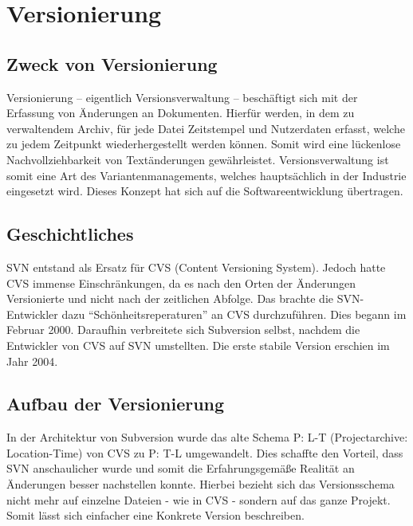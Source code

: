 \section{Versionierung}%

\subsection{Zweck von Versionierung}

Versionierung -- eigentlich Versionsverwaltung -- beschäftigt sich mit der Erfassung von Änderungen an Dokumenten. Hierfür werden, in dem zu verwaltendem Archiv, für jede Datei Zeitstempel und Nutzerdaten erfasst, welche zu jedem Zeitpunkt wiederhergestellt werden können. Somit wird eine lückenlose Nachvollziehbarkeit von Textänderungen gewährleistet. Versionsverwaltung ist somit eine Art des Variantenmanagements, welches hauptsächlich in der Industrie eingesetzt wird. Dieses Konzept hat sich auf die Softwareentwicklung übertragen. 

\subsection{Geschichtliches}
SVN entstand als Ersatz für CVS (Content Versioning System). Jedoch hatte CVS immense Einschränkungen, da es nach den Orten der Änderungen Versionierte und nicht nach der zeitlichen Abfolge. Das brachte die SVN-Entwickler dazu "`Schönheitsreperaturen"' an CVS durchzuführen. Dies begann im Februar 2000. Daraufhin verbreitete sich Subversion selbst, nachdem die Entwickler von CVS auf SVN umstellten. Die erste stabile Version erschien im Jahr 2004.

\subsection{Aufbau der Versionierung}
In der Architektur von Subversion wurde das alte Schema P: L-T (Projectarchive: Location-Time) von CVS zu P: T-L umgewandelt. Dies schaffte den Vorteil, dass SVN anschaulicher wurde und somit die Erfahrungsgemäße Realität an Änderungen besser nachstellen konnte. Hierbei bezieht sich das Versionsschema nicht mehr auf einzelne Dateien - wie in CVS - sondern auf das ganze Projekt. Somit lässt sich einfacher eine Konkrete Version beschreiben. \\